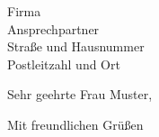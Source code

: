 \documentclass[backaddress=off]{friggeri-minimal-letter}
\date{\today}
\begin{document}

\begin{letter}{%
    Firma\\
    Ansprechpartner\\
    Straße und Hausnummer\\
    Postleitzahl und Ort}
%
%
\opening{Sehr geehrte Frau Muster,}
%
\Blindtext[1]
%
\closing{Mit freundlichen Grüßen}


\end{letter}
\end{document}
